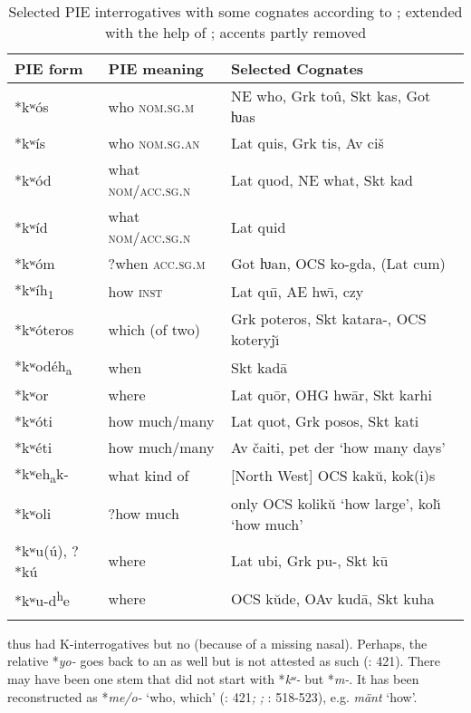 \begin{table}
\caption{Selected PIE interrogatives with some cognates according to \cite[419f.]{MalloryAdams2006}; extended with the help of \cite[436-441, 453-479]{Dunkel2014}; accents partly removed}
\label{tab:indo:3}

\begin{tabularx}{\textwidth}{llQ}
\lsptoprule

\textbf{PIE form} & \textbf{PIE meaning} & \textbf{Selected Cognates}\\
\midrule
*kʷós & who \textsc{nom.sg.m} & NE who, Grk toû, Skt kas, Got ƕas\\
*kʷís & who \textsc{nom.sg.an} & Lat quis, Grk tis, Av ciš\\
*kʷód & what \textsc{nom/acc.sg.n} & Lat quod, NE what, Skt kad\\
*kʷíd & what \textsc{nom/acc.sg.n} & Lat quid\\
*kʷóm & ?when \textsc{acc.sg.m} & Got ƕan, OCS ko-gda, (Lat cum)\\
*kʷíh\textsubscript{1} & how \textsc{inst} & Lat qu\={\i}, AE hw\={\i},  czy\\
*kʷóteros & which (of two) & Grk poteros, Skt katara-, OCS koteryj\u{\i}\\
*kʷodéh\textsubscript{a} & when & Skt kad\=a\\
*kʷor & where & Lat qu\=or, OHG hw\=ar, Skt karhi\\
*kʷóti & how much/many & Lat quot, Grk posos, Skt kati\\
*kʷéti & how much/many & Av čaiti,  pet der ‘how many days’\\
*kʷeh\textsubscript{a}k- & what kind of & [North West] OCS kakŭ,  kok(i)s\\
*kʷoli & ?how much & only OCS kolikŭ ‘how large’, kol\u{\i} ‘how much’\\
*kʷu(ú), ?*kú & where & Lat ubi, Grk pu-, Skt k\=u\\
*kʷu-d\textsuperscript{h}e & where & OCS kŭde, OAv kud\=a, Skt kuha\\
\lspbottomrule
\end{tabularx}
\end{table}

 thus had K-interrogatives but no  (because of a missing nasal). Perhaps, the relative *\textit{yo-} goes back to an  as well but is not attested as such (\citealt{MalloryAdams2006}: 421). There may have been one  stem that did not start with *\textit{kʷ}\textit{-} but *\textit{m-}. It has been reconstructed as *\textit{me/o-} ‘who, which’ (\citealt{MalloryAdams2006}: 421\emph{\textup{;}} \citealt{CysouwHackstein2011}\emph{\textup{;}} \citealt{Dunkel2014}: 518-523), e.g.  \textit{mänt} ‘how’.

